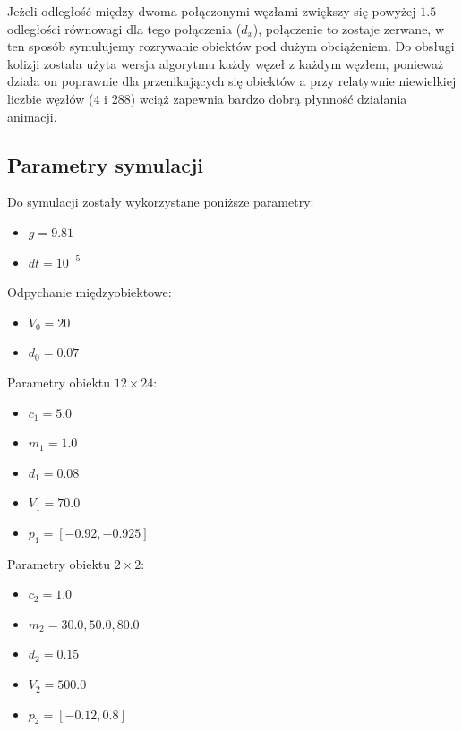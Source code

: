 \documentclass[12pt, letterpaper]{report}
\begin{document}
    Jeżeli odległość między dwoma połączonymi węzłami zwiększy się powyżej $1.5$ odległości równowagi dla 
    tego połączenia ($d_x$), połączenie to zostaje zerwane, w ten sposób symulujemy rozrywanie obiektów pod dużym 
    obciążeniem. Do obsługi kolizji została użyta wersja algorytmu każdy węzeł z każdym węzłem, ponieważ
    działa on poprawnie dla przenikających się obiektów a przy relatywnie niewielkiej liczbie 
    węzłów ($4$ i $288$) wciąż zapewnia bardzo dobrą płynność działania animacji.

    \subsection{Parametry symulacji}
    Do symulacji zostały wykorzystane poniższe parametry:
    \begin{multicols*}{2}
        \begin{itemize}
            \item $g = 9.81$
            \item $dt = 10^{-5}$
        \end{itemize}
        Odpychanie międzyobiektowe:
        \begin{itemize}
            \item $V_{0} = 20$
            \item $d_{0} = 0.07$
        \end{itemize}
        Parametry obiektu $12 \times 24$:
        \begin{itemize}
            \item $c_{1} = 5.0$
            \item $m_{1} = 1.0$
            \item $d_{1} = 0.08$
            \item $V_{1} = 70.0$
            \item $p_{1} = [-0.92, -0.925]$
        \end{itemize}
        Parametry obiektu $2 \times 2$:
        \begin{itemize}
            \item $c_{2} = 1.0$
            \item $m_{2} = 30.0, 50.0, 80.0$
            \item $d_{2} = 0.15$
            \item $V_{2} = 500.0$
            \item $p_{2} = [-0.12, 0.8]$
        \end{itemize}
    \end{multicols*}
\end{document}
